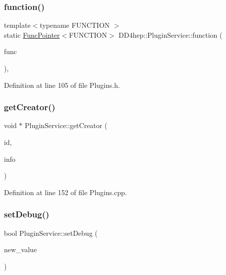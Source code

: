 \subsubsection{\texorpdfstring{function()}{function()}}
{\footnotesize\ttfamily template$<$typename F\+U\+N\+C\+T\+I\+ON $>$ \\
static \hyperlink{struct_d_d4hep_1_1_plugin_service_1_1_func_pointer}{Func\+Pointer}$<$F\+U\+N\+C\+T\+I\+ON$>$ D\+D4hep\+::\+Plugin\+Service\+::function (\begin{DoxyParamCaption}\item[{F\+U\+N\+C\+T\+I\+ON}]{func }\end{DoxyParamCaption})\hspace{0.3cm}{\ttfamily [inline]}, {\ttfamily [static]}}



Definition at line 105 of file Plugins.\+h.

\hypertarget{class_d_d4hep_1_1_plugin_service_a63fcd240235468c6408563b0057c82df}{}\label{class_d_d4hep_1_1_plugin_service_a63fcd240235468c6408563b0057c82df} 
\subsubsection{\texorpdfstring{get\+Creator()}{getCreator()}}
{\footnotesize\ttfamily void $\ast$ Plugin\+Service\+::get\+Creator (\begin{DoxyParamCaption}\item[{const std\+::string \&}]{id,  }\item[{const std\+::type\+\_\+info \&}]{info }\end{DoxyParamCaption})\hspace{0.3cm}{\ttfamily [static]}}



Definition at line 152 of file Plugins.\+cpp.

\hypertarget{class_d_d4hep_1_1_plugin_service_a54147a8801746a0304f8b6c63aa0e083}{}\label{class_d_d4hep_1_1_plugin_service_a54147a8801746a0304f8b6c63aa0e083} 
\subsubsection{\texorpdfstring{set\+Debug()}{setDebug()}}
{\footnotesize\ttfamily bool Plugin\+Service\+::set\+Debug (\begin{DoxyParamCaption}\item[{bool}]{new\+\_\+value }\end{DoxyParamCaption})\hspace{0.3cm}{\ttfamily [static]}}




